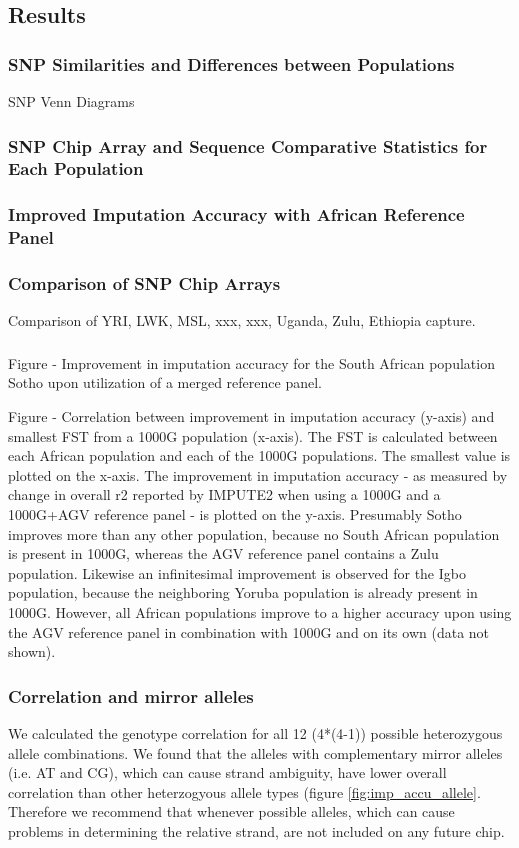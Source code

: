 \subsection{Results}

\subsubsection{SNP Similarities and Differences between Populations}
SNP Venn Diagrams
\subsubsection{SNP Chip Array and Sequence Comparative Statistics for Each Population}
\subsubsection{Improved Imputation Accuracy with African Reference Panel}
\subsubsection{Comparison of SNP Chip Arrays}
Comparison of YRI, LWK, MSL, xxx, xxx, Uganda, Zulu, Ethiopia capture.

\subsubsection{}

Figure - Improvement in imputation accuracy for the South African population Sotho upon utilization of a merged reference panel.

Figure - Correlation between improvement in imputation accuracy (y-axis) and smallest FST from a 1000G population (x-axis). The FST is calculated between each African population and each of the 1000G populations. The smallest value is plotted on the x-axis. The improvement in imputation accuracy - as measured by change in overall r2 reported by IMPUTE2 when using a 1000G and a 1000G+AGV reference panel - is plotted on the y-axis. Presumably Sotho improves more than any other population, because no South African population is present in 1000G, whereas the AGV reference panel contains a Zulu population. Likewise an infinitesimal improvement is observed for the Igbo population, because the neighboring Yoruba population is already present in 1000G. However, all African populations improve to a higher accuracy upon using the AGV reference panel in combination with 1000G and on its own (data not shown).

\subsubsection{Correlation and mirror alleles}
We calculated the genotype correlation for all 12 (4*(4-1)) possible heterozygous allele combinations. We found that the alleles with complementary mirror alleles (i.e. AT and CG), which can cause strand ambiguity, have lower overall correlation than other heterzogyous allele types (figure \ref{fig:imp_accu_allele}. Therefore we recommend that whenever possible alleles, which can cause problems in determining the relative strand, are not included on any future chip.

